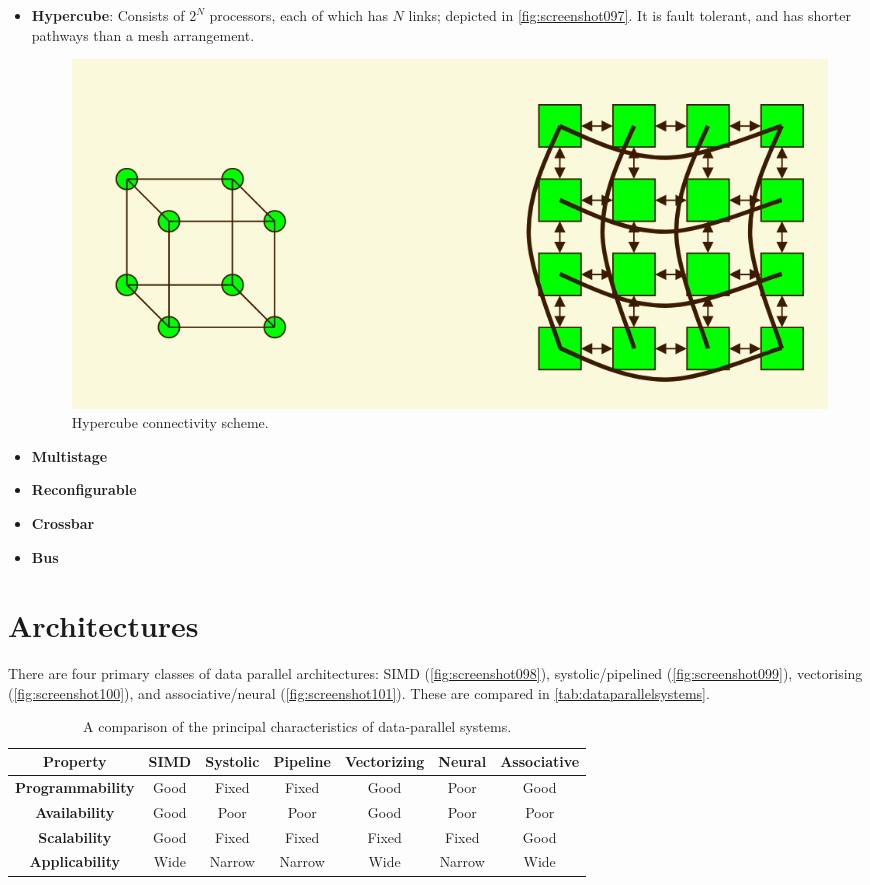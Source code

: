 \begin{itemize}
\item \textbf{Hypercube}: Consists of $2^N$ processors, each of which has $N$ links; depicted in \autoref{fig:screenshot097}. It is fault tolerant, and has shorter pathways than a mesh arrangement.

\begin{figure}
\centering
\includegraphics[width=0.5\linewidth]{screenshot097}
\caption{Hypercube connectivity scheme.}
\label{fig:screenshot097}
\end{figure}

\item \textbf{Multistage} 
\item \textbf{Reconfigurable} 
\item \textbf{Crossbar} 
\item \textbf{Bus}
\end{itemize}

\section{Architectures}
There are four primary classes of data parallel architectures: SIMD (\autoref{fig:screenshot098}), systolic/pipelined (\autoref{fig:screenshot099}), vectorising (\autoref{fig:screenshot100}), and associative/neural (\autoref{fig:screenshot101}). These are compared in \autoref{tab:dataparallelsystems}.
\begin{table}[H]
\caption{A comparison of the principal characteristics of data-parallel systems.}
\label{tab:dataparallelsystems}
\begin{tabular}{|c|c|c|c|c|c|c|}
\hline 
\textbf{Property} & \textbf{SIMD} & \textbf{Systolic} & \textbf{Pipeline} & \textbf{Vectorizing} & \textbf{Neural} & \textbf{Associative} \\ 
\hline 
\textbf{Programmability} & Good & Fixed & Fixed & Good & Poor & Good \\ 
\hline 
\textbf{Availability} & Good & Poor & Poor & Good & Poor & Poor \\ 
\hline 
\textbf{Scalability} & Good & Fixed & Fixed & Fixed & Fixed & Good \\ 
\hline 
\textbf{Applicability} & Wide & Narrow & Narrow & Wide & Narrow & Wide \\ 
\hline 
\end{tabular} 
\end{table}

